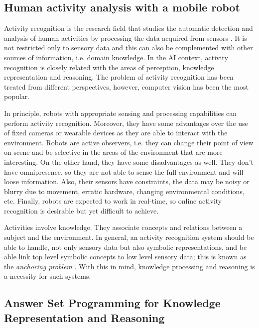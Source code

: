 \subsection{Human activity analysis with a mobile robot}
Activity recognition is the research field that studies the automatic detection and analysis of human activities by processing the data acquired from sensors \citep{Aggarwal14_HumActRec3DRev}. 
It is not restricted only to sensory data and this can also be complemented with other sources of information, i.e. domain knowledge.
In the AI context, activity recognition is closely related with the areas of perception, knowledge representation and reasoning. 
The problem of activity recognition has been treated from different perspectives, however, computer vision has been the most popular.

In principle, robots with appropriate sensing and processing capabilities can perform activity recognition. 
Moreover, they have some advantages over the use of fixed cameras or wearable devices as they are able to interact with the environment. 
Robots are active observers, i.e. they can change their point of view on scene and be selective in the areas of the environment that are more interesting. 
On the other hand, they have some disadvantages as well. 
They don't have omnipresence, so they are not able to sense the full environment and will loose information.
Also, their sensors have constraints, the data may be noisy or blurry due to movement, erratic hardware, changing environmental conditions, etc. 
Finally, robots are expected to work in real-time, so online activity recognition is desirable but yet difficult to achieve.

Activities involve knowledge.
They associate concepts and relations between a subject and the environment.
In general, an activity recognition system should be able to handle, not only sensory data but also symbolic representations, and be able link top level symbolic concepts to low level sensory data; this is known as the \textit{anchoring problem} \citep{Coradeschi03_AnchoringProblem}.
With this in mind, knowledge processing and reasoning is a necessity for such systems.


\subsection{Answer Set Programming for Knowledge Representation and Reasoning}

